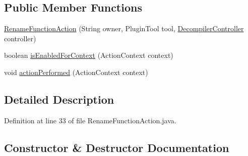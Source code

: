 \subsection*{Public Member Functions}
\begin{DoxyCompactItemize}
\item 
\mbox{\hyperlink{classghidra_1_1app_1_1plugin_1_1core_1_1decompile_1_1actions_1_1_rename_function_action_aed858eb213ca5daa296b3093d7acc33b}{Rename\+Function\+Action}} (String owner, Plugin\+Tool tool, \mbox{\hyperlink{classghidra_1_1app_1_1decompiler_1_1component_1_1_decompiler_controller}{Decompiler\+Controller}} controller)
\item 
boolean \mbox{\hyperlink{classghidra_1_1app_1_1plugin_1_1core_1_1decompile_1_1actions_1_1_rename_function_action_a68d2dcd140bdd31b9eedfcca3b08450d}{is\+Enabled\+For\+Context}} (Action\+Context context)
\item 
void \mbox{\hyperlink{classghidra_1_1app_1_1plugin_1_1core_1_1decompile_1_1actions_1_1_rename_function_action_a67fbf7fa2650bcc9761f5f92f2d4a741}{action\+Performed}} (Action\+Context context)
\end{DoxyCompactItemize}


\subsection{Detailed Description}


Definition at line 33 of file Rename\+Function\+Action.\+java.



\subsection{Constructor \& Destructor Documentation}
\mbox{\label{classghidra_1_1app_1_1plugin_1_1core_1_1decompile_1_1actions_1_1_rename_function_action_aed858eb213ca5daa296b3093d7acc33b}} 
